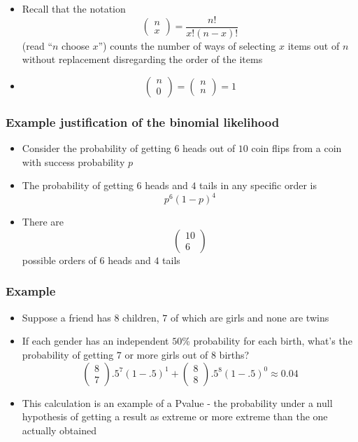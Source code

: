 \documentclass[aspectratio=169]{beamer}
\begin{document}
\begin{frame}
\begin{itemize}
\item Recall that the notation 
  $$\left(
    \begin{array}{c}
      n \\ x
    \end{array}
  \right) = \frac{n!}{x!(n-x)!}
  $$ (read ``$n$ choose $x$'') counts the number of ways of selecting $x$ items out of $n$
  without replacement disregarding the order of the items
\item
$$\left(
    \begin{array}{c}
      n \\ 0
    \end{array}
  \right) =
\left(
    \begin{array}{c}
      n \\ n
    \end{array}
  \right) =  1
  $$ 
\end{itemize}
\end{frame}

\begin{frame}\frametitle{Example justification of the binomial likelihood}
\begin{itemize}
\item Consider the probability of getting $6$ heads out of $10$ coin flips from 
  a coin with success probability $p$ 
\item The probability of getting $6$ heads and $4$ tails in any specific
  order is
  $$
  p^6(1-p)^4
  $$
\item There are 
$$\left(
\begin{array}{c}
  10 \\ 6
\end{array}
\right)
$$
possible orders of $6$ heads and $4$ tails
\end{itemize}
\end{frame}

\begin{frame}\frametitle{Example}
\begin{itemize}
\item Suppose a friend has $8$ children, $7$ of which are girls and none are twins
\item If each gender has an independent $50$\% probability for each birth, what's the probability
  of getting $7$ or more girls out of $8$ births?
$$\left(
\begin{array}{c}
  8 \\ 7
\end{array}
\right) .5^{7}(1-.5)^{1}
+
\left(
\begin{array}{c}
  8 \\ 8
\end{array}
\right) .5^{8}(1-.5)^{0} \approx 0.04
$$
\item This calculation is an example of a Pvalue - the probability
  under a null hypothesis of getting a result as extreme or more
  extreme than the one actually obtained
\end{itemize}
\end{frame}
\end{document}
